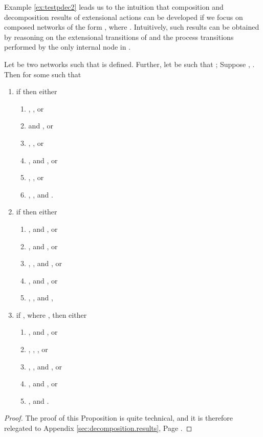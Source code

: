 \documentclass{LMCS}
\begin{document}
Example \ref{ex:testpdec2} leads us to the intuition that composition and decomposition 
results of extensional actions can be developed if we focus on composed networks of the 
form , where . Intuitively, 
such results can be obtained by reasoning on the 
extensional transitions of  and the 
process transitions performed by the only internal node in . 





\begin{prop}\label{prop:decomp}
  Let  be two networks such that  
  is defined. Further, let  be such 
  that ; 
  Suppose , . 
  Then  for some 
   such that 
  
  \begin{enumerate}\item if  then either 
		\begin{enumerate}[label=(\roman*)]
			\item , , or
			\item  and , or 
			\item , 
			, or
			\item ,  and 
			, or
			\item , 
			, or 
			\item , 
			,  and 
			.
		\end{enumerate}
		
		\item if  then either
		 \begin{enumerate}[label=(\roman*)]
		 \item , 
		  and , or  
		 \item , 
		  and , or 
		 \item , 
		 ,  and , or
		 \item ,  
		 and , or 
		 \item , , 
		  and ,
		 \end{enumerate}
		
		\item if , where , then either 
		 \begin{enumerate}[label=(\roman*)]
		 \item ,  
		 and , or
		 \item , , , or 
		 \item , ,  
		 and , or
		 \item ,  
		 and , or  
		 \item ,  and .
		 \end{enumerate}
		\end{enumerate}
\end{prop}
\begin{proof}
  The proof of this Proposition is quite technical, and it is 
  therefore relegated to Appendix \ref{sec:decomposition.results}, Page \pageref{proof:decomp}.
\end{proof}
\end{document}

